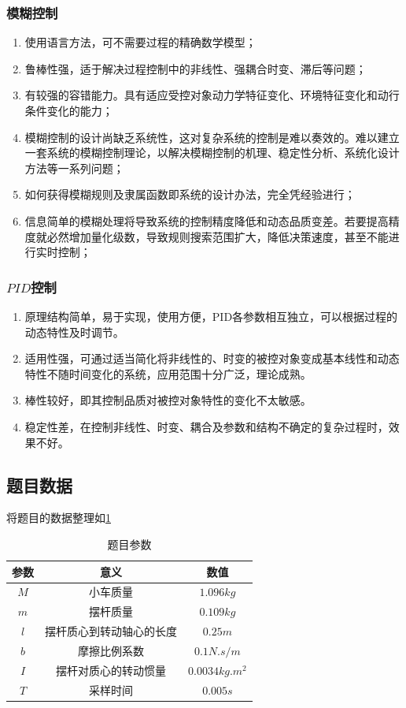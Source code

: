 \documentclass{MathorCupmodeling}
\begin{document}
\subsubsection{模糊控制}
\begin{enumerate}
\item 使用语言方法，可不需要过程的精确数学模型；
\item 鲁棒性强，适于解决过程控制中的非线性、强耦合时变、滞后等问题；
\item 有较强的容错能力。具有适应受控对象动力学特征变化、环境特征变化和动行条件变化的能力；
\item 模糊控制的设计尚缺乏系统性，这对复杂系统的控制是难以奏效的。难以建立一套系统的模糊控制理论，以解决模糊控制的机理、稳定性分析、系统化设计方法等一系列问题；
\item 如何获得模糊规则及隶属函数即系统的设计办法，完全凭经验进行；
\item 信息简单的模糊处理将导致系统的控制精度降低和动态品质变差。若要提高精度就必然增加量化级数，导致规则搜索范围扩大，降低决策速度，甚至不能进行实时控制；
\end{enumerate}

\subsubsection{$PID$控制}
\begin{enumerate}
\item 原理结构简单，易于实现，使用方便，PID各参数相互独立，可以根据过程的动态特性及时调节。
\item 适用性强，可通过适当简化将非线性的、时变的被控对象变成基本线性和动态特性不随时间变化的系统，应用范围十分广泛，理论成熟。
\item 棒性较好，即其控制品质对被控对象特性的变化不太敏感。
\item 稳定性差，在控制非线性、时变、耦合及参数和结构不确定的复杂过程时，效果不好。
\end{enumerate}

\subsection{题目数据}

将题目的数据整理如\cref{参数}

\begin{table}[h]
\centering
\begin{tabular}{ccc}
\hline
参数 & 意义           & 数值                            \\ \hline
$M$  & 小车质量         & $1.096kg$                       \\ \hline
$m$ & 摆杆质量         & $0.109kg$                       \\ \hline
$l$  & 摆杆质心到转动轴心的长度 & $0.25m$                         \\ \hline
$b$  & 摩擦比例系数       & $0.1N.s/m$                      \\ \hline
$I$  & 摆杆对质心的转动惯量   & $0.0034kg.m^2$ \\ \hline
$T$  & 采样时间         & $0.005s$                        \\ \hline
\end{tabular}
\caption{题目参数}\label{参数}
\end{table}

\end{document}
